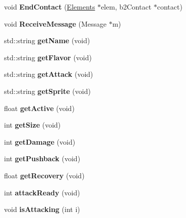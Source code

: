 \begin{DoxyCompactItemize}
\item 
\hypertarget{class_weapon_a1860f840f8c75555de52450300139d9b}{void {\bfseries End\-Contact} (\hyperlink{class_elements}{Elements} $\ast$elem, b2\-Contact $\ast$contact)}\label{class_weapon_a1860f840f8c75555de52450300139d9b}

\item 
\hypertarget{class_weapon_ad93665811c3df9c05bb22b9a1a9c1a66}{void {\bfseries Receive\-Message} (Message $\ast$m)}\label{class_weapon_ad93665811c3df9c05bb22b9a1a9c1a66}

\item 
\hypertarget{class_weapon_aa49263888dca8ee505a95294371adbf6}{std\-::string {\bfseries get\-Name} (void)}\label{class_weapon_aa49263888dca8ee505a95294371adbf6}

\item 
\hypertarget{class_weapon_abe73556e16426da65572d7981dcc800f}{std\-::string {\bfseries get\-Flavor} (void)}\label{class_weapon_abe73556e16426da65572d7981dcc800f}

\item 
\hypertarget{class_weapon_a693e8f30f48b5df1983c22fdf796f25b}{std\-::string {\bfseries get\-Attack} (void)}\label{class_weapon_a693e8f30f48b5df1983c22fdf796f25b}

\item 
\hypertarget{class_weapon_ace3e431278e9ac23f33d222c67c38497}{std\-::string {\bfseries get\-Sprite} (void)}\label{class_weapon_ace3e431278e9ac23f33d222c67c38497}

\item 
\hypertarget{class_weapon_aea6024533cc9ca0ce72139ebf5da33f9}{float {\bfseries get\-Active} (void)}\label{class_weapon_aea6024533cc9ca0ce72139ebf5da33f9}

\item 
\hypertarget{class_weapon_a47baa57bfa8b9bfeda891d3180caa399}{int {\bfseries get\-Size} (void)}\label{class_weapon_a47baa57bfa8b9bfeda891d3180caa399}

\item 
\hypertarget{class_weapon_a35f92fc79c009c1d1d7d41b4fa17bb11}{int {\bfseries get\-Damage} (void)}\label{class_weapon_a35f92fc79c009c1d1d7d41b4fa17bb11}

\item 
\hypertarget{class_weapon_a60a49fa0a0a76a58698d9b4000815a8b}{int {\bfseries get\-Pushback} (void)}\label{class_weapon_a60a49fa0a0a76a58698d9b4000815a8b}

\item 
\hypertarget{class_weapon_a18a362244c6a169db89536505eaa2f15}{float {\bfseries get\-Recovery} (void)}\label{class_weapon_a18a362244c6a169db89536505eaa2f15}

\item 
\hypertarget{class_weapon_aded3e214d38d181504d49719cfc08fa5}{int {\bfseries attack\-Ready} (void)}\label{class_weapon_aded3e214d38d181504d49719cfc08fa5}

\item 
\hypertarget{class_weapon_a24f4509a23008f783c566ffa68548fb4}{void {\bfseries is\-Attacking} (int i)}\label{class_weapon_a24f4509a23008f783c566ffa68548fb4}

\end{DoxyCompactItemize}
